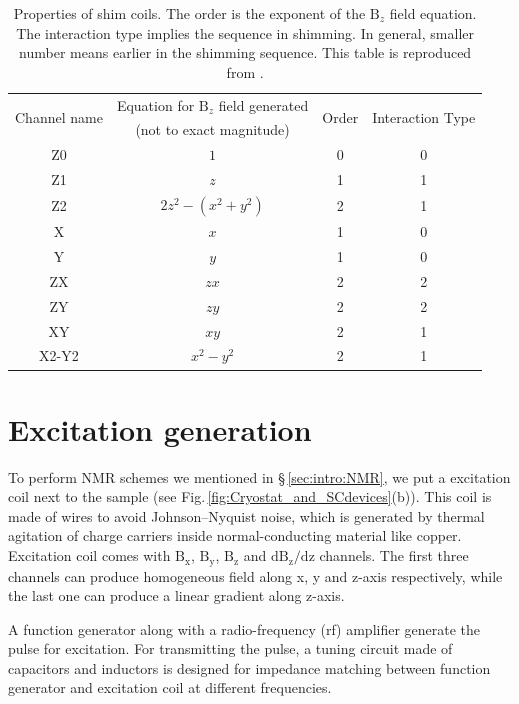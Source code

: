 \begin{table}[ht]
\centering
\caption{Properties of shim coils. The order is the exponent of the $\mathrm{B}_z$ field equation. The interaction type implies the sequence in shimming. In general, smaller number means earlier in the shimming sequence. This table is reproduced from \cite{Conover1999TheSO}. }
\begin{tabular}{cccc}
	\hline
	\multirow{2}{*}{Channel name} & Equation for $\mathrm{B}_z$ field generated & \multirow{2}{*}{Order} & \multirow{2}{*}{Interaction Type} \\
	 & (not to exact magnitude) & & \\
	\midrule
	Z0 & $1$ & 0 & 0 \\
	Z1 & $z$ & 1 & 1 \\
	Z2 & $2z^2 - (x^2 + y^2)$ & 2 & 1 \\
	X & $x$ & 1 & 0 \\
	Y & $y$ & 1 & 0 \\
	ZX & $zx$ & 2 & 2 \\
	ZY & $zy$ & 2 & 2 \\
	XY & $xy$ & 2 & 1 \\
	X2-Y2 & $x^2-y^2$ & 2 & 1 \\
	\bottomrule
\end{tabular}
\label{tab:shimproperity}
\end{table}


\section{Excitation generation}

To perform NMR schemes we mentioned in \S\,\ref{sec:intro:NMR}, we put a excitation coil next to the sample (see Fig.\,\ref{fig:Cryostat_and_SCdevices}(b)). This coil is made of  wires to avoid Johnson–Nyquist noise, which is generated by thermal agitation of charge carriers inside normal-conducting material like copper. Excitation coil comes with $\mathrm{B_x}$, $\mathrm{B_y}$, $\mathrm{B_z}$ and $\mathrm{d B_z/dz}$ channels. The first three channels can produce homogeneous field along x, y and z-axis respectively, while the last one can produce a linear gradient along z-axis. 

A function generator along with a radio-frequency (rf) amplifier generate the pulse for excitation. For transmitting the pulse, a tuning circuit made of capacitors and inductors is designed for impedance matching between function generator and excitation coil at different frequencies. 


